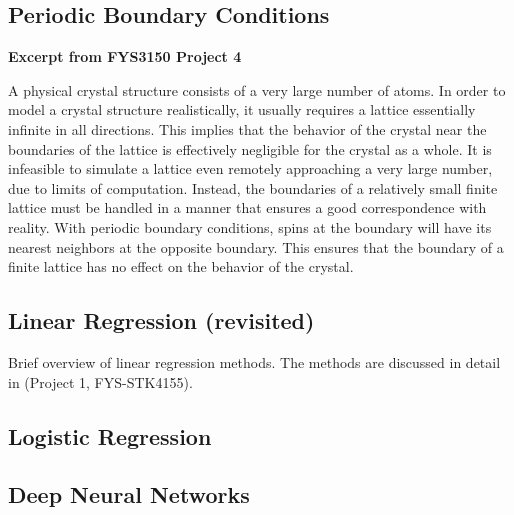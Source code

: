 \subsection{Periodic Boundary Conditions}\label{sec:pbc theory}
\textbf{Excerpt from FYS3150 Project 4}

A physical crystal structure consists of a very large number of atoms. In order to model a crystal structure realistically, it usually requires a lattice essentially infinite in all directions. This implies that the behavior of the crystal near the boundaries of the lattice is effectively negligible for the crystal as a whole. It is infeasible to simulate a lattice even remotely approaching a very large number, due to limits of computation. Instead, the boundaries of a relatively small finite lattice must be handled in a manner that ensures a good correspondence with reality. With periodic boundary conditions, spins at the boundary will have its nearest neighbors at the opposite boundary. This ensures that the boundary of a finite lattice has no effect on the behavior of the crystal.


\subsection{Linear Regression (revisited)}\label{sec:linreg theory}
Brief overview of linear regression methods. The methods are discussed in detail in (Project 1, FYS-STK4155).


\subsection{Logistic Regression}\label{sec:logreg theory}


\subsection{Deep Neural Networks}\label{sec:dnn theory}



